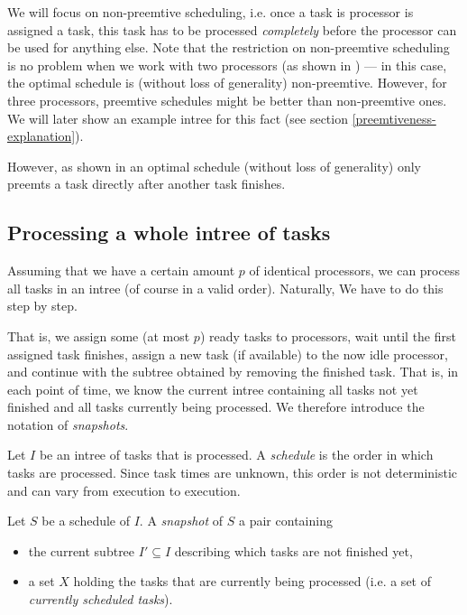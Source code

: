 We will focus on non-preemtive scheduling, i.e. once a task is processor is assigned a task, this task has to be processed \emph{completely} before the processor can be used for anything else. Note that the restriction on non-preemtive scheduling is no problem when we work with two processors (as shown in \cite{chandyreynoldslargepaper1979}) --- in this case, the optimal schedule is (without loss of generality) non-preemtive. However, for three processors, preemtive schedules might be better than non-preemtive ones. We will later show an example intree for this fact (see section \ref{preemtiveness-explanation}).

However, as shown in \cite{chandyreynoldslargepaper1979} an optimal schedule (without loss of generality) only preemts a task directly after another task finishes.

\subsection{Processing a whole intree of tasks}
\label{sec:processing-an-intree-of-tasks}

Assuming that we have a certain amount $p$ of identical processors, we can process all tasks in an intree (of course in a valid order). Naturally, We have to do this step by step. 

That is, we assign some (at most $p$) ready tasks to processors, wait until the first assigned task finishes, assign a new task (if available) to the now idle processor, and continue with the subtree obtained by removing the finished task. That is, in each point of time, we know the current intree containing all tasks not yet finished and all tasks currently being processed. We therefore introduce the notation of \emph{snapshots}.

\begin{definition}  
  Let $I$ be an intree of tasks that is processed. A \emph{schedule} is the order in which tasks are processed. Since task times are unknown, this order is not deterministic and can vary from execution to execution.

  Let $S$ be a schedule of $I$.
  A \emph{snapshot} of $S$ a pair containing
  \begin{itemize}
  \item the current subtree $I'\subseteq I$ describing which tasks are not finished yet,
  \item a set $X$ holding the tasks that are currently being processed (i.e. a set of \emph{currently scheduled tasks}).
  \end{itemize}
\end{definition}

